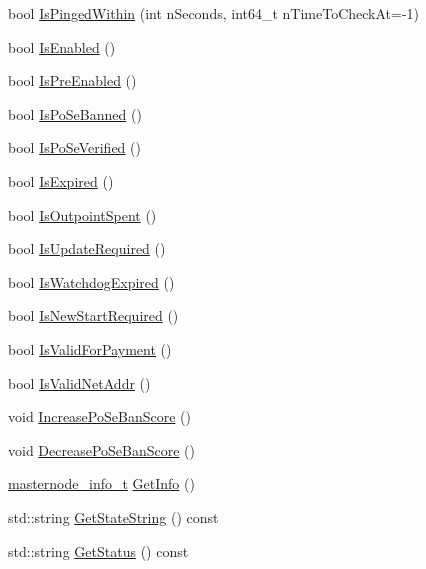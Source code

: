 \begin{DoxyCompactItemize}
\item 
bool \mbox{\hyperlink{class_c_masternode_a454e41f5850cb1307c66de0ac82b16a3}{Is\+Pinged\+Within}} (int n\+Seconds, int64\+\_\+t n\+Time\+To\+Check\+At=-\/1)
\item 
bool \mbox{\hyperlink{class_c_masternode_a08782379f6ba10e9087b39f0cef19bce}{Is\+Enabled}} ()
\item 
bool \mbox{\hyperlink{class_c_masternode_a28f41bd6e252b191c4a8536fdac24e40}{Is\+Pre\+Enabled}} ()
\item 
bool \mbox{\hyperlink{class_c_masternode_a76f6fefcb586fef33c2ed3a72d8b56e2}{Is\+Po\+Se\+Banned}} ()
\item 
bool \mbox{\hyperlink{class_c_masternode_aa2b0fe59f7c687cfa072f9bcd5efeda7}{Is\+Po\+Se\+Verified}} ()
\item 
bool \mbox{\hyperlink{class_c_masternode_a15c8c3351d7a91b7cce67a07b27a37b0}{Is\+Expired}} ()
\item 
bool \mbox{\hyperlink{class_c_masternode_aed1070b99fd2948d7d914ee14f138466}{Is\+Outpoint\+Spent}} ()
\item 
bool \mbox{\hyperlink{class_c_masternode_a1b66eca7ab7dafe127beb09d9380d692}{Is\+Update\+Required}} ()
\item 
bool \mbox{\hyperlink{class_c_masternode_a0426da4b6e2c87a738b5473deef2fc0c}{Is\+Watchdog\+Expired}} ()
\item 
bool \mbox{\hyperlink{class_c_masternode_a992b914fa9ffdecc626320ef0923f0a3}{Is\+New\+Start\+Required}} ()
\item 
bool \mbox{\hyperlink{class_c_masternode_adee8a89597ac5746d85e021f0bee209d}{Is\+Valid\+For\+Payment}} ()
\item 
bool \mbox{\hyperlink{class_c_masternode_a70f120b4964fdd802a6975bfb9017a23}{Is\+Valid\+Net\+Addr}} ()
\item 
void \mbox{\hyperlink{class_c_masternode_a43e72f4eaaaf69429304d35a0bd172d8}{Increase\+Po\+Se\+Ban\+Score}} ()
\item 
void \mbox{\hyperlink{class_c_masternode_ae0de8b6e894d03f297ff274f3c107892}{Decrease\+Po\+Se\+Ban\+Score}} ()
\item 
\mbox{\hyperlink{structmasternode__info__t}{masternode\+\_\+info\+\_\+t}} \mbox{\hyperlink{class_c_masternode_a9b6912ac2d8ee011aba8837cb85ada63}{Get\+Info}} ()
\item 
std\+::string \mbox{\hyperlink{class_c_masternode_a24785b00a72b9c3c43e21bf2ef84b456}{Get\+State\+String}} () const
\item 
std\+::string \mbox{\hyperlink{class_c_masternode_ac9983ac170cb085c6f826e5fcd9a9a5b}{Get\+Status}} () const

\end{DoxyCompactItemize}
